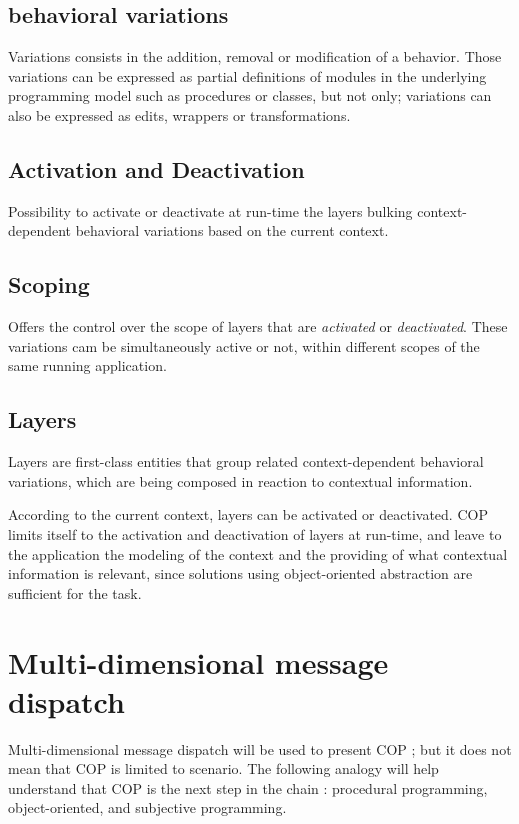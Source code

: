 \documentclass[journal,10pt,compsoc]{IEEEtran}
\begin{document}
\subsection{behavioral variations}
\label{sec:org3f630da}


Variations consists in the addition, removal or modification of a behavior. 
Those variations can be expressed as partial definitions of modules in the underlying programming model such as procedures or classes,
but not only; variations can also be expressed as edits, wrappers or transformations.

\subsection{Activation and Deactivation}
\label{sec:orgf1e685d}


Possibility to activate or deactivate at run-time the layers bulking context-dependent behavioral variations based on the current context. 

\subsection{Scoping}
\label{sec:org51ee5d2}


Offers the control over the scope of layers that are \emph{activated} or \emph{deactivated}. These variations cam be simultaneously active or not,
within different scopes of the same running application.

\subsection{Layers}
\label{sec:org761e187}


Layers are first-class entities that group related context-dependent behavioral variations, which are being composed in reaction to contextual information.

  According to the current context, layers can be activated or deactivated. COP limits itself to the activation and deactivation of layers at run-time,
  and leave to the application the modeling of the context and the providing of what contextual information is relevant, since solutions using object-oriented
abstraction are sufficient for the task. \cite{dey2001understanding}  

\section{Multi-dimensional message dispatch}
\label{sec:org43ea783}
Multi-dimensional message dispatch \cite{smith1996simple} will be used to present COP ; but it does not mean that COP is limited to scenario. The following analogy will help understand 
that COP is the next step in the chain : procedural programming, object-oriented, and subjective programming.
\end{document}
